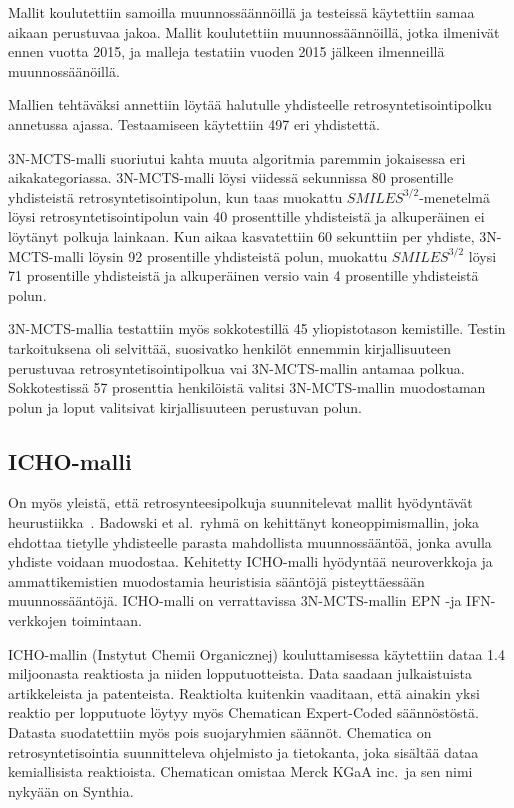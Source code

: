 \documentclass[finnish,twoside,censored,tkt,sw-line]{HYthesisML}
\begin{document}
Mallit koulutettiin samoilla muunnossäännöillä ja testeissä käytettiin samaa aikaan perustuvaa jakoa.
Mallit koulutettiin muunnossäännöillä, jotka ilmenivät ennen vuotta 2015, ja malleja testatiin vuoden 2015 jälkeen ilmenneillä muunnossäänöillä.

Mallien tehtäväksi annettiin löytää halutulle yhdisteelle retrosyntetisointipolku annetussa ajassa.
Testaamiseen käytettiin 497 eri yhdistettä.

3N-MCTS-malli suoriutui kahta muuta algoritmia paremmin jokaisessa eri aikakategoriassa.
3N-MCTS-malli löysi viidessä sekunnissa 80 prosentille yhdisteistä retrosyntetisointipolun, kun taas muokattu \(SMILES^{3/2}\)-menetelmä löysi retrosyntetisointipolun vain 40 prosenttille yhdisteistä ja alkuperäinen ei löytänyt polkuja lainkaan.
Kun aikaa kasvatettiin 60 sekunttiin per yhdiste, 3N-MCTS-malli löysin 92 prosentille yhdisteistä polun, muokattu \(SMILES^{3/2}\) löysi 71 prosentille yhdisteistä ja alkuperäinen versio vain 4 prosentille yhdisteistä polun.

3N-MCTS-mallia testattiin myös sokkotestillä 45 yliopistotason kemistille.
Testin tarkoituksena oli selvittää, suosivatko henkilöt ennemmin kirjallisuuteen perustuvaa retrosyntetisointipolkua vai 3N-MCTS-mallin antamaa polkua.
Sokkotestissä 57 prosenttia henkilöistä valitsi 3N-MCTS-mallin muodostaman polun ja loput valitsivat kirjallisuuteen perustuvan polun.

\subsection{ICHO-malli}

On myös yleistä, että retrosynteesipolkuja suunnitelevat mallit hyödyntävät heurustiikka~\cite{ExpertKnowledgeRetorsynthesis}.
Badowski et al.\ ryhmä on kehittänyt koneoppimismallin, joka ehdottaa tietylle yhdisteelle parasta mahdollista muunnossääntöä, jonka avulla yhdiste voidaan muodostaa.
Kehitetty ICHO-malli hyödyntää  neuroverkkoja ja ammattikemistien muodostamia heuristisia sääntöjä pisteyttäessään muunnossääntöjä.
ICHO-malli on verrattavissa 3N-MCTS-mallin EPN -ja IFN-verkkojen toimintaan.

ICHO-mallin (Instytut Chemii Organicznej) kouluttamisessa käytettiin dataa 1.4 miljoonasta reaktiosta ja niiden lopputuotteista.
Data saadaan julkaistuista artikkeleista ja patenteista.
Reaktiolta kuitenkin vaaditaan, että ainakin yksi reaktio per lopputuote löytyy myös Chematican Expert-Coded säännöstöstä.
Datasta suodatettiin myös pois suojaryhmien säännöt.
Chematica on retrosyntetisointia suunnitteleva ohjelmisto ja tietokanta, joka sisältää dataa kemiallisista reaktioista.
Chematican omistaa Merck KGaA inc.\ ja sen nimi nykyään on Synthia.
\end{document}
